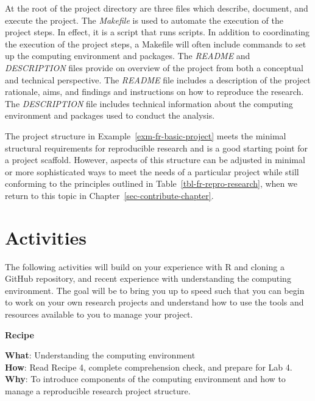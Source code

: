 \documentclass[
  letterpaper,
]{latex/krantz}
\theoremstyle{definition}
\theoremstyle{remark}
\begin{document}
At the root of the project directory are three files which describe,
document, and execute the project. The \emph{Makefile} is used to
automate the execution of the project steps. In effect, it is a script
that runs scripts. In addition to coordinating the execution of the
project steps, a Makefile will often include commands to set up the
computing environment and packages. The \emph{README} and
\emph{DESCRIPTION} files provide on overview of the project from both a
conceptual and technical perspective. The \emph{README} file includes a
description of the project rationale, aims, and findings and
instructions on how to reproduce the research. The \emph{DESCRIPTION}
file includes technical information about the computing environment and
packages used to conduct the analysis.

The project structure in Example~\ref{exm-fr-basic-project} meets the
minimal structural requirements for reproducible research and is a good
starting point for a project scaffold. However, aspects of this
structure can be adjusted in minimal or more sophisticated ways to meet
the needs of a particular project while still conforming to the
principles outlined in Table~\ref{tbl-fr-repro-research}, when we return
to this topic in Chapter~\ref{sec-contribute-chapter}.

\section*{Activities}\label{activities-2}


The following activities will build on your experience with R and
cloning a GitHub repository, and recent experience with understanding
the computing environment. The goal will be to bring you up to speed
such that you can begin to work on your own research projects and
understand how to use the tools and resources available to you to manage
your project.

\begin{tcolorbox}[enhanced jigsaw, colframe=quarto-callout-color-frame, breakable, bottomrule=.15mm, arc=.35mm, left=2mm, opacityback=0, rightrule=.15mm, colback=white, toprule=.15mm, leftrule=.75mm]

\textbf{ Recipe}

\textbf{What}: Understanding the computing environment\\
\textbf{How}: Read Recipe 4, complete comprehension check, and prepare
for Lab 4.\\
\textbf{Why}: To introduce components of the computing environment and
how to manage a reproducible research project structure.

\end{tcolorbox}
\end{document}
